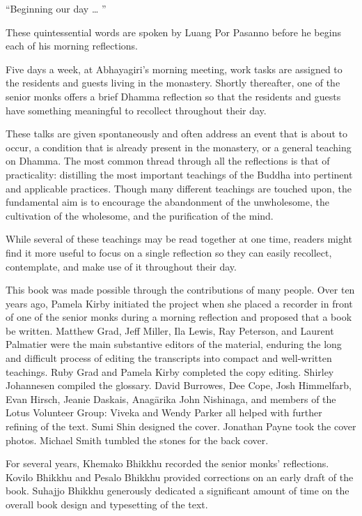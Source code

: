``Beginning our day \ldots{} ''

These quintessential words are spoken by Luang Por Pasanno before he 
begins each of his morning reflections.

Five days a week, at Abhayagiri's morning meeting, work tasks are 
assigned to the residents and guests living in the monastery. Shortly 
thereafter, one of the senior monks offers a brief Dhamma reflection so 
that the residents and guests have something meaningful to recollect 
throughout their day.

These talks are given spontaneously and often address an event that is 
about to occur, a condition that is already present in the monastery, 
or a general teaching on Dhamma. The most common thread through all the 
reflections is that of practicality: distilling the most important 
teachings of the Buddha into pertinent and applicable practices. Though 
many different teachings are touched upon, the fundamental aim is to 
encourage the abandonment of the unwholesome, the cultivation of the 
wholesome, and the purification of the mind.

While several of these teachings may be read together at one time, 
readers might find it more useful to focus on a single reflection so 
they can easily recollect, contemplate, and make use of it throughout 
their day.

This book was made possible through the contributions of many people. 
Over ten years ago, Pamela Kirby initiated the project when she placed 
a recorder in front of one of the senior monks during a morning 
reflection and proposed that a book be written. Matthew Grad, Jeff 
Miller, Ila Lewis, Ray Peterson, and Laurent Palmatier were the main 
substantive editors of the material, enduring the long and difficult 
process of editing the transcripts into compact and well-written 
teachings. Ruby Grad and Pamela Kirby completed the copy editing. 
Shirley Johannesen compiled the glossary. David Burrowes, Dee Cope, 
Josh Himmelfarb, Evan Hirsch, Jeanie Daskais, Anagārika John 
Nishinaga, and members of the Lotus Volunteer Group: Viveka and Wendy 
Parker all helped with further refining of the text. Sumi Shin designed 
the cover. Jonathan Payne took the cover photos. Michael Smith tumbled 
the stones for the back cover.

For several years, Khemako Bhikkhu recorded the senior monks' 
reflections. Kovilo Bhikkhu and Pesalo Bhikkhu provided corrections on 
an early draft of the book. Suhajjo Bhikkhu generously dedicated a 
significant amount of time on the overall book design and typesetting 
of the text.

